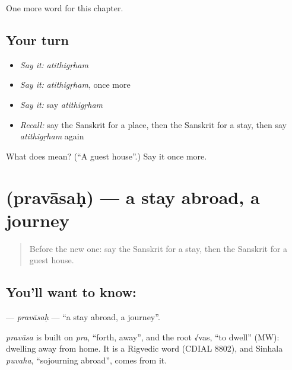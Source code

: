 \begin{grammarlens}[title={What you've built}]
One more word for this chapter.
\end{grammarlens}

\subsection*{Your turn}
\begin{itemize}
\raggedright
  \item \emph{Say it:} \emph{atithigṛham}
  \item \emph{Say it:} \emph{atithigṛham}, once more
  \item \emph{Say it:} say \emph{atithigṛham}
  \item \emph{Recall:} say the Sanskrit for a place, then the Sanskrit for a stay, then say \emph{atithigṛham} again
\end{itemize}

\begin{tcolorbox}[breakable,colback=teal!4,colframe=teal!35!black,title={Before you move on}]
What does  mean? (\textquotedblleft{}A guest house\textquotedblright{}.) Say it once more.
\end{tcolorbox}
\section[\texorpdfstring{\sk{प्रवासः} (pravāsaḥ)}{प्रवासः (pravāsaḥ)}]{ (pravāsaḥ) — a stay abroad, a journey}

\label{lesson:SA-C231-pravasah}



\begin{quote}
Before the new one: say the Sanskrit for a stay, then the Sanskrit for a guest house.
\end{quote}

\subsection*{You'll want to know: }
\textbf{} — \emph{pravāsaḥ} — \textquotedblleft{}a stay abroad, a journey\textquotedblright{}.

\begin{cousinweb}
\emph{pravāsa} is built on \emph{pra}, \textquotedblleft{}forth, away\textquotedblright{}, and the root √vas, \textquotedblleft{}to dwell\textquotedblright{} (MW): dwelling away from home. It is a Rigvedic word (CDIAL 8802), and Sinhala \emph{puvaha}, \textquotedblleft{}sojourning abroad\textquotedblright{}, comes from it.
\end{cousinweb}

